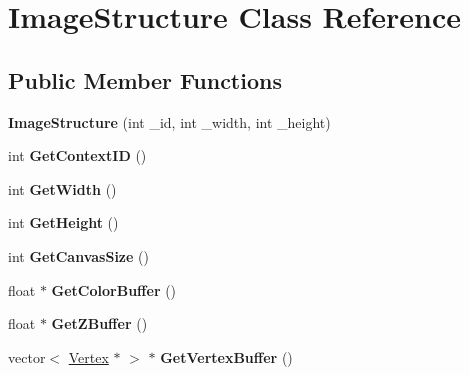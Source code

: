 \hypertarget{class_image_structure}{}\section{Image\+Structure Class Reference}
\label{class_image_structure}
\subsection*{Public Member Functions}
\begin{DoxyCompactItemize}
\item 
\mbox{\label{class_image_structure_abacb592e440dae8a781fec79668c6b0d}} 
{\bfseries Image\+Structure} (int \+\_\+id, int \+\_\+width, int \+\_\+height)
\item 
\mbox{\label{class_image_structure_a41206114ffee12e439bc5bac8a46ac1d}} 
int {\bfseries Get\+Context\+ID} ()
\item 
\mbox{\label{class_image_structure_a2245ecfc9d8cefdd5b45ccb2fc72580d}} 
int {\bfseries Get\+Width} ()
\item 
\mbox{\label{class_image_structure_a80da2e964cec395d6dc79be8a369e525}} 
int {\bfseries Get\+Height} ()
\item 
\mbox{\label{class_image_structure_a6d49c43c4dd8b6a6c632868239294371}} 
int {\bfseries Get\+Canvas\+Size} ()
\item 
\mbox{\label{class_image_structure_a50a60a7b1d004850ec2481244bacaa1e}} 
float $\ast$ {\bfseries Get\+Color\+Buffer} ()
\item 
\mbox{\label{class_image_structure_aee62aa0f5fc1407652c9421b324b09b7}} 
float $\ast$ {\bfseries Get\+Z\+Buffer} ()
\item 
\mbox{\label{class_image_structure_ab40631d101553ff8b9110f36f5e60956}} 
vector$<$ \hyperlink{class_vertex}{Vertex} $\ast$ $>$ $\ast$ {\bfseries Get\+Vertex\+Buffer} ()
\item 
\mbox{\label{class_image_structure_a19d296f05d2b1db0c585dcb4aefb9577}} 

\end{DoxyCompactItemize}
